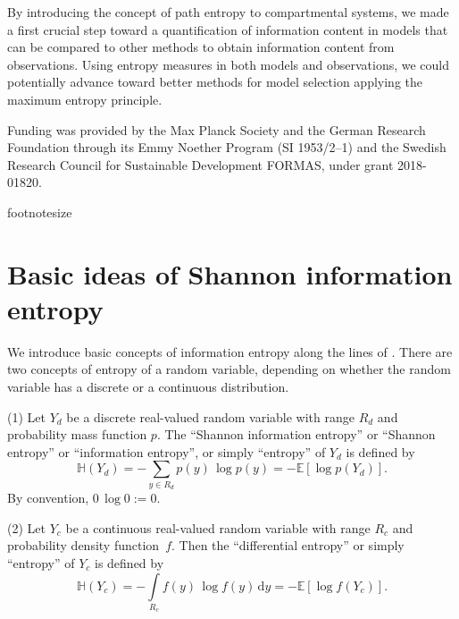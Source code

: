 \documentclass[smallextended]{svjour3}
\newcommand{\E}{\mathbb{E}}
\renewcommand{\H}{\mathbb{H}}
\newcommand{\suml}{\sum\limits}
\newcommand{\intl}{\int\limits}
\newcommand{\dd}[1]{\,\mathrm{d}#1}
\newcommand{\pdf}{probability density function}
\renewcommand{\emph}[1]{``#1''}
\begin{document}
By introducing the concept of path entropy to compartmental systems, we made a first crucial step toward a quantification of information content in models that can be compared to other methods to obtain information content from observations. Using entropy measures in both models and observations, we could potentially advance toward better methods for model selection applying the maximum entropy principle. 

\newpage

\begin{acknowledgements}
Funding was provided by the Max Planck Society and the German Research Foundation through its Emmy Noether Program (SI 1953/2--1) and the Swedish Research Council for Sustainable Development FORMAS, under grant 2018-01820.
\end{acknowledgements}

% 

{footnotesize
}


\appendix

\section{Basic ideas of Shannon information entropy}
\label{sec:entropy_basics_extended}
We introduce basic concepts of information entropy along the lines of \citet{Cover2006}.
There are two concepts of entropy of a random variable, depending on whether the random variable has a discrete or a continuous distribution.
\begin{definition}%
\label{def:discrete_entropy}
	(1) Let $Y_d$ be a discrete real-valued random variable with range $R_d$ and probability mass function $p$.
	The \emph{Shannon information entropy} or \emph{Shannon entropy} or \emph{information entropy}, or simply \emph{entropy} of $Y_d$ is defined by
	\begin{equation}
		\H(Y_d) = -\suml_{y\in R_d} p(y)\,\log p(y) = -\E\left[\log p(Y_d)\right].
	\end{equation}
	By convention, $0\,\log 0:=0$.
	
	(2) Let $Y_c$ be a continuous real-valued random variable with range $R_c$ and \pdf\ $f$.
	Then the \emph{differential entropy} or simply \emph{entropy} of $Y_c$ is defined by
	\begin{equation}
		\H(Y_c) = -\intl_{R_c} f(y)\,\log f(y)\dd{y} = -\E\left[\log f(Y_c)\right].
	\end{equation}
\end{definition}
\end{document}
